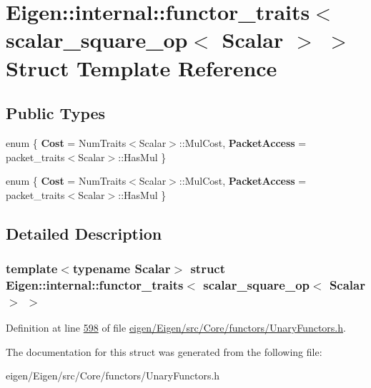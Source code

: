 \hypertarget{struct_eigen_1_1internal_1_1functor__traits_3_01scalar__square__op_3_01_scalar_01_4_01_4}{}\section{Eigen\+:\+:internal\+:\+:functor\+\_\+traits$<$ scalar\+\_\+square\+\_\+op$<$ Scalar $>$ $>$ Struct Template Reference}
\label{struct_eigen_1_1internal_1_1functor__traits_3_01scalar__square__op_3_01_scalar_01_4_01_4}
\subsection*{Public Types}
\begin{DoxyCompactItemize}
\item 
\mbox{\label{struct_eigen_1_1internal_1_1functor__traits_3_01scalar__square__op_3_01_scalar_01_4_01_4_a1360a47b6e8cb61bf114c92760b5ce45}} 
enum \{ {\bfseries Cost} = Num\+Traits$<$Scalar$>$\+:\+:Mul\+Cost, 
{\bfseries Packet\+Access} = packet\+\_\+traits$<$Scalar$>$\+:\+:Has\+Mul
 \}
\item 
\mbox{\label{struct_eigen_1_1internal_1_1functor__traits_3_01scalar__square__op_3_01_scalar_01_4_01_4_ad35fb1085d8cd6c4e2a54e41d948b2c4}} 
enum \{ {\bfseries Cost} = Num\+Traits$<$Scalar$>$\+:\+:Mul\+Cost, 
{\bfseries Packet\+Access} = packet\+\_\+traits$<$Scalar$>$\+:\+:Has\+Mul
 \}
\end{DoxyCompactItemize}


\subsection{Detailed Description}
\subsubsection*{template$<$typename Scalar$>$\newline
struct Eigen\+::internal\+::functor\+\_\+traits$<$ scalar\+\_\+square\+\_\+op$<$ Scalar $>$ $>$}



Definition at line \hyperlink{eigen_2_eigen_2src_2_core_2functors_2_unary_functors_8h_source_l00598}{598} of file \hyperlink{eigen_2_eigen_2src_2_core_2functors_2_unary_functors_8h_source}{eigen/\+Eigen/src/\+Core/functors/\+Unary\+Functors.\+h}.



The documentation for this struct was generated from the following file\+:\begin{DoxyCompactItemize}
\item 
eigen/\+Eigen/src/\+Core/functors/\+Unary\+Functors.\+h\end{DoxyCompactItemize}
